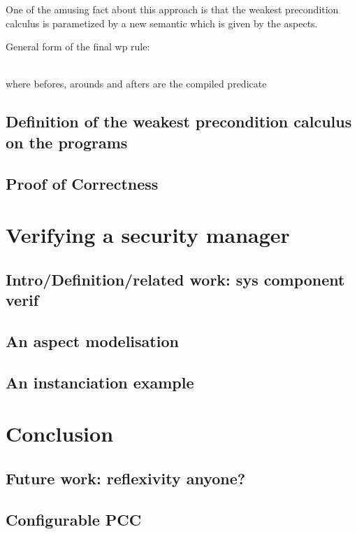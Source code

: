 \documentclass[draft]{llncs}
\begin{document}
One of the amusing fact about this approach is that the weakest precondition calculus is parametized by a new 
semantic which is given by the aspects.

General form of the final wp rule:
\bcode

\\
\ecode
where befores, arounds and afters are the compiled predicate
\subsection{Definition of the weakest precondition calculus on the programs}
\subsection{Proof of Correctness}
%
\section{Verifying a security manager}
\subsection{Intro/Definition/related work: sys component verif}
\subsection{An aspect modelisation}
\subsection{An instanciation example}
\section{Conclusion}
\subsection{Future work: reflexivity anyone?}
\subsection{Configurable PCC}
%
%




%
\end{document}
